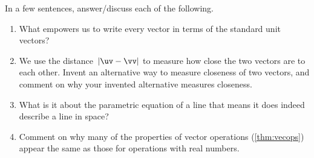 \begin{exercise}  
In a few sentences, answer\slash discuss each of the following.
\begin{enumerate}
\item What empowers us to write every vector in terms of the standard unit vectors?

\item We use the distance~\(|\uv-\vv|\) to measure how close the two vectors are to each other.  Invent an alternative way to measure closeness of two vectors, and comment on why your invented alternative measures closeness.

\item What is it about the parametric equation of a line that means it does indeed describe a line in space?

\item Comment on why many of the properties of vector operations (\cref{thm:vecops}) appear the same as those for operations with real numbers. 


\end{enumerate}
\end{exercise}





\begin{comment}%
why, what caused X?
how did X occur?
what-if? what-if-not?
how does X compare with Y?
what is the evidence for X?
why is X important?
\end{comment}
